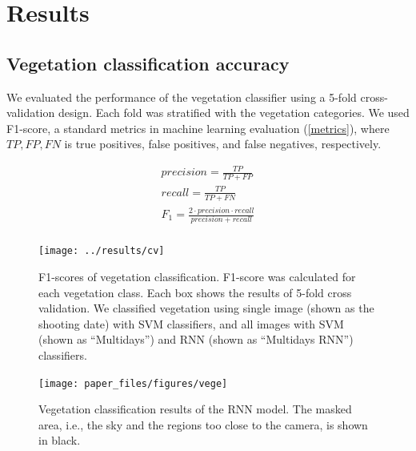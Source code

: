 \documentclass{article}
\begin{document}
\hypertarget{results}{%
\section{Results}\label{results}}

\hypertarget{vegetation-classification-accuracy}{%
\subsection{Vegetation classification accuracy}\label{vegetation-classification-accuracy}}

We evaluated the performance of the vegetation classifier using a 5-fold cross-validation design. Each fold was stratified with the vegetation categories. We used F1-score, a standard metrics in machine learning evaluation (\ref{metrics}), where \(TP, FP, FN\) is true positives, false positives, and false negatives, respectively.

\label{metrics}
\begin{align}
  precision = \frac{TP}{TP + FP} \\
  recall = \frac{TP}{TP + FN} \\
  F_1 = \frac{2 \cdot precision \cdot recall}{precision + recall} \\
\end{align}



\begin{figure}
\texttt{[image: ../results/cv]} \caption{F1-scores of vegetation classification. F1-score was calculated for each vegetation class. Each box shows the results of 5-fold cross validation. We classified vegetation using single image (shown as the shooting date) with SVM classifiers, and all images with SVM (shown as ``Multidays'') and RNN (shown as ``Multidays RNN'') classifiers.}\label{fig:vegeacc}
\end{figure}



\begin{figure}
\texttt{[image: paper\_files/figures/vege]} \caption{Vegetation classification results of the RNN model. The masked area, i.e., the sky and the regions too close to the camera, is shown in black.}\label{fig:vegetation}
\end{figure}
\end{document}
